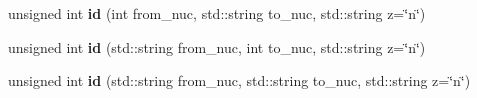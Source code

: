\begin{Indent}
\begin{DoxyCompactItemize}
\item 
\mbox{\label{namespacepyne_1_1rxname_a59db818b92ee0c58e5da5e29ecccb7b3}} 
unsigned int {\bfseries id} (int from\+\_\+nuc, std\+::string to\+\_\+nuc, std\+::string z=\char`\"{}n\char`\"{})
\item 
\mbox{\label{namespacepyne_1_1rxname_aeef408cf1b26de2f7828c35981db3f88}} 
unsigned int {\bfseries id} (std\+::string from\+\_\+nuc, int to\+\_\+nuc, std\+::string z=\char`\"{}n\char`\"{})
\item 
\mbox{\label{namespacepyne_1_1rxname_a8b635b6cfe404af21b0a0c7744d911aa}} 
unsigned int {\bfseries id} (std\+::string from\+\_\+nuc, std\+::string to\+\_\+nuc, std\+::string z=\char`\"{}n\char`\"{})
\end{DoxyCompactItemize}
\end{Indent}

